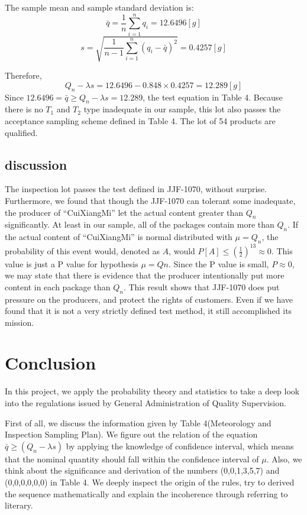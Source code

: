 \documentclass[conf]{new-aiaa}
\begin{document}
The sample mean and sample standard deviation is:
\begin{equation}
	\bar q=\frac{1}{n}\sum_{i=1}^{n}q_i=12.6496[g]
\end{equation}
\begin{equation}
	s=\sqrt{\frac{1}{n-1}\sum_{i=1}^{n}(q_i-\bar q)^2}=0.4257[g]
\end{equation}

Therefore, 
$$
Q_n-\lambda s=12.6496 - 0.848 \times 0.4257 = 12.289[g]
$$
Since $12.6496 = \bar q\geq Q_n-\lambda s = 12.289$, the test equation in Table 4. Because there is no $T_1$ and $T_2$ type inadequate in our sample, this lot also passes the acceptance sampling scheme defined in Table 4. The lot of 54 products are qualified.
\subsection{discussion}
The inspection lot passes the test defined in JJF-1070, without surprise. Furthermore, we found that though the JJF-1070 can tolerant some inadequate, the producer of ``CuiXiangMi'' let the actual content greater than $Q_n$ significantly. At least in our sample, all of the packages contain more than $Q_n$. If the actual content of ``CuiXiangMi'' is normal distributed with $\mu = Q_n$, the probability of this event would, denoted as $A$, would $P[A] \leq \left(\frac{1}{2}\right)^{13} \approx 0$. This value is just a P value for hypothesis $\mu = Qn$. Since the P value is small, $P \approx 0$, we may state that there is evidence that the producer intentionally put more content in each package than $Q_n$. This result shows that JJF-1070 does put pressure on the producers, and protect the rights of customers. Even if we have found that it is not a very strictly defined test method, it still accomplished its mission.

\newpage

\section{Conclusion}
In this project, we apply the probability theory and statistics to take a deep look into the regulations issued by General Administration of Quality Supervision.

First of all, we discuss the information given by Table 4(Meteorology and Inspection Sampling Plan). We figure out the relation of the equation $\bar{q}\ge (Q_n-\lambda s)$ by applying the knowledge of confidence interval, which means that the nominal quantity should fall within the confidence interval of $\mu$.  Also, we think about the significance and derivation of the numbers (0,0,1,3,5,7) and (0,0,0,0,0,0) in Table 4. We deeply inspect the origin of the rules, try to derived the sequence mathematically and explain the incoherence through referring to literary.
\end{document}
